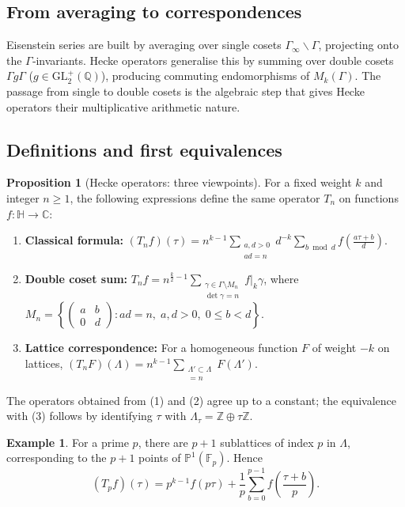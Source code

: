 \documentclass[10pt, a4paper]{article}
\newcommand{\C}{\mathbb{C}}
\newcommand{\Z}{\mathbb{Z}}
\newcommand{\Q}{\mathbb{Q}}
\newcommand{\HH}{\mathbb{H}} %
\theoremstyle{definition}
\newtheorem{proposition}[theorem]{Proposition}
\newtheorem{example}[theorem]{Example}
\theoremstyle{remark}
\begin{document}
\subsection{From averaging to correspondences}

Eisenstein series are built by averaging over single cosets $\Gamma_\infty\backslash\Gamma$, projecting onto the $\Gamma$‑invariants. Hecke operators generalise this by summing over double cosets $\Gamma g \Gamma$ ($g\in\mathrm{GL}_2^+(\Q)$), producing commuting endomorphisms of $M_k(\Gamma)$. The passage from single to double cosets is the algebraic step that gives Hecke operators their multiplicative arithmetic nature.

\subsection{Definitions and first equivalences}

\begin{proposition}[Hecke operators: three viewpoints]
For a fixed weight $k$ and integer $n\geq 1$, the following expressions define the same operator $T_n$ on functions $f:\HH\to\C$:
\begin{enumerate}
    \item \textbf{Classical formula:} 
    $\displaystyle (T_n f)(\tau) = n^{k-1}\sum_{\substack{a,d>0\\ ad=n}} d^{-k}\sum_{b\bmod d} f\!\left(\frac{a\tau+b}{d}\right)$.
    \item \textbf{Double coset sum:} 
    $\displaystyle T_n f = n^{\frac{k}{2}-1}\sum_{\substack{\gamma\in\Gamma\setminus M_n\\ \det\gamma=n}} f|_k\gamma$, 
    where $M_n = \left\{ \begin{pmatrix}a&b\\0&d\end{pmatrix} : ad=n,\; a,d>0,\; 0\leq b<d \right\}$.
    \item \textbf{Lattice correspondence:} For a homogeneous function $F$ of weight $-k$ on lattices,
    $\displaystyle (T_n F)(\Lambda) = n^{k-1}\sum_{\substack{\Lambda'\subset\Lambda\\ [\Lambda:\Lambda']=n}} F(\Lambda')$.
\end{enumerate}
The operators obtained from (1) and (2) agree up to a constant; the equivalence with (3) follows by identifying $\tau$ with $\Lambda_\tau = \Z\oplus\tau\Z$.
\end{proposition}

\begin{example}
For a prime $p$, there are $p+1$ sublattices of index $p$ in $\Lambda$, corresponding to the $p+1$ points of $\mathbb P^1(\mathbb F_p)$. Hence
\[
(T_p f)(\tau) = p^{k-1} f(p\tau) + \frac1p\sum_{b=0}^{p-1} f\!\left(\frac{\tau+b}{p}\right).
\]
\end{example}
\end{document}
